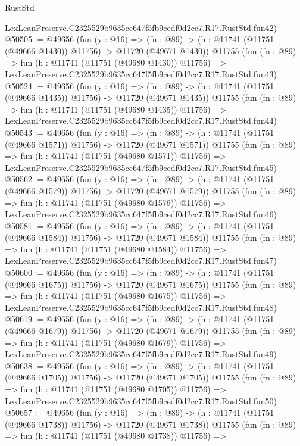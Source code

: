 \begin{lexlean}{RustStd}
\begin{coremodule}
    LexLeanPreserve.C2325529b9635cc647f5fb9cedf0d2cc7.R17.RustStd.fun42)
@50505 := @49656
    (fun (y : @16) =>
    (fn : @89) -> (h : @11741 (@11751 (@49666 @1430)) @11756) -> @11720 (@49671 @1430))
    @11755
    (fun (fn : @89) =>
    fun (h : @11741 (@11751 (@49680 @1430)) @11756) =>
    LexLeanPreserve.C2325529b9635cc647f5fb9cedf0d2cc7.R17.RustStd.fun43)
@50524 := @49656
    (fun (y : @16) =>
    (fn : @89) -> (h : @11741 (@11751 (@49666 @1435)) @11756) -> @11720 (@49671 @1435))
    @11755
    (fun (fn : @89) =>
    fun (h : @11741 (@11751 (@49680 @1435)) @11756) =>
    LexLeanPreserve.C2325529b9635cc647f5fb9cedf0d2cc7.R17.RustStd.fun44)
@50543 := @49656
    (fun (y : @16) =>
    (fn : @89) -> (h : @11741 (@11751 (@49666 @1571)) @11756) -> @11720 (@49671 @1571))
    @11755
    (fun (fn : @89) =>
    fun (h : @11741 (@11751 (@49680 @1571)) @11756) =>
    LexLeanPreserve.C2325529b9635cc647f5fb9cedf0d2cc7.R17.RustStd.fun45)
@50562 := @49656
    (fun (y : @16) =>
    (fn : @89) -> (h : @11741 (@11751 (@49666 @1579)) @11756) -> @11720 (@49671 @1579))
    @11755
    (fun (fn : @89) =>
    fun (h : @11741 (@11751 (@49680 @1579)) @11756) =>
    LexLeanPreserve.C2325529b9635cc647f5fb9cedf0d2cc7.R17.RustStd.fun46)
@50581 := @49656
    (fun (y : @16) =>
    (fn : @89) -> (h : @11741 (@11751 (@49666 @1584)) @11756) -> @11720 (@49671 @1584))
    @11755
    (fun (fn : @89) =>
    fun (h : @11741 (@11751 (@49680 @1584)) @11756) =>
    LexLeanPreserve.C2325529b9635cc647f5fb9cedf0d2cc7.R17.RustStd.fun47)
@50600 := @49656
    (fun (y : @16) =>
    (fn : @89) -> (h : @11741 (@11751 (@49666 @1675)) @11756) -> @11720 (@49671 @1675))
    @11755
    (fun (fn : @89) =>
    fun (h : @11741 (@11751 (@49680 @1675)) @11756) =>
    LexLeanPreserve.C2325529b9635cc647f5fb9cedf0d2cc7.R17.RustStd.fun48)
@50619 := @49656
    (fun (y : @16) =>
    (fn : @89) -> (h : @11741 (@11751 (@49666 @1679)) @11756) -> @11720 (@49671 @1679))
    @11755
    (fun (fn : @89) =>
    fun (h : @11741 (@11751 (@49680 @1679)) @11756) =>
    LexLeanPreserve.C2325529b9635cc647f5fb9cedf0d2cc7.R17.RustStd.fun49)
@50638 := @49656
    (fun (y : @16) =>
    (fn : @89) -> (h : @11741 (@11751 (@49666 @1705)) @11756) -> @11720 (@49671 @1705))
    @11755
    (fun (fn : @89) =>
    fun (h : @11741 (@11751 (@49680 @1705)) @11756) =>
    LexLeanPreserve.C2325529b9635cc647f5fb9cedf0d2cc7.R17.RustStd.fun50)
@50657 := @49656
    (fun (y : @16) =>
    (fn : @89) -> (h : @11741 (@11751 (@49666 @1738)) @11756) -> @11720 (@49671 @1738))
    @11755
    (fun (fn : @89) =>
    fun (h : @11741 (@11751 (@49680 @1738)) @11756) =>

\end{coremodule}
\end{lexlean}
